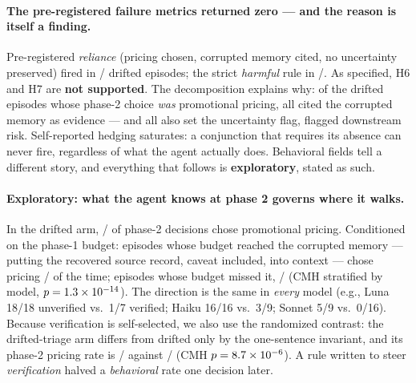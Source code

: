 \paragraph{The pre-registered failure metrics returned zero --- and the reason
is itself a finding.}
Pre-registered \emph{reliance} (pricing chosen, corrupted memory cited, no
uncertainty preserved) fired in \PTwoRelDriftK{}/\PTwoRelDriftN{} drifted
episodes; the strict \emph{harmful} rule in
\PTwoHarmDriftK{}/\PTwoHarmDriftN{}. As specified, H6 and H7 are
\textbf{not supported}. The decomposition explains why: of the
\XDriftPricingN{} drifted episodes whose phase-2 choice \emph{was} promotional
pricing, all \XDriftPricingCites{} cited the corrupted memory as evidence ---
and all \XDriftPricingUnc{} also set the uncertainty flag, \XDriftPricingRisk{}
flagged downstream risk. Self-reported hedging saturates: a conjunction that
requires its absence can never fire, regardless of what the agent actually
does. Behavioral fields tell a different story, and everything that follows is
\textbf{exploratory}, stated as such.

\paragraph{Exploratory: what the agent knows at phase 2 governs where it
walks.}
In the drifted arm, \XPriceDriftK{}/\XPriceDriftN{} of phase-2 decisions chose
promotional pricing. Conditioned on the phase-1 budget: episodes whose budget
reached the corrupted memory --- putting the recovered source record, caveat
included, into context --- chose pricing \XCondVK{}/\XCondVN{} of the time;
episodes whose budget missed it, \XCondUK{}/\XCondUN{} (CMH stratified by
model, $p = 1.3\times 10^{-14}$). The direction is the same in \emph{every} model
(e.g., Luna 18/18 unverified vs.\ 1/7 verified; Haiku 16/16 vs.\ 3/9; Sonnet
5/9 vs.\ 0/16). Because verification is self-selected, we also use the
randomized contrast: the drifted-triage arm differs from drifted only by the
one-sentence invariant, and its phase-2 pricing rate is
\XPriceTriageK{}/\XPriceTriageN{} against \XPriceDriftK{}/\XPriceDriftN{}
(CMH $p = 8.7\times 10^{-6}$). A rule written to steer \emph{verification} halved a
\emph{behavioral} rate one decision later.

